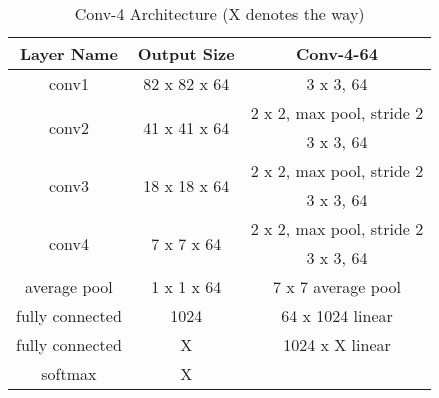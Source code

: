 \begin{table*}[hbt!]
\begin{center}
\begin{tabular}{|c|c|c|}
\hline
Layer Name             & Output Size                   & Conv-4-64                 \\ \hline\hline
conv1                  & 82 x 82 x 64                  & 3 x 3, 64                 \\ \hline
\multirow{2}{*}{conv2} & \multirow{2}{*}{41 x 41 x 64} & 2 x 2, max pool, stride 2 \\ \cline{3-3} 
                       &                               & 3 x 3, 64                 \\ \hline
\multirow{2}{*}{conv3} & \multirow{2}{*}{18 x 18 x 64} & 2 x 2, max pool, stride 2 \\ \cline{3-3} 
                       &                               & 3 x 3, 64                 \\ \hline
\multirow{2}{*}{conv4} & \multirow{2}{*}{7 x 7 x 64}   & 2 x 2, max pool, stride 2 \\ \cline{3-3} 
                       &                               & 3 x 3, 64                 \\ \hline
average pool           & 1 x 1 x 64                    & 7 x 7 average pool        \\ \hline
fully connected        & 1024                             & 64 x 1024 linear  \\ \hline
fully connected        & X                             & 1024 x X linear  \\ \hline
softmax                & X                             &                           \\ \hline
\end{tabular}
\end{center}
\caption{Conv-4 Architecture (X denotes the way)}
\label{table:conv_arch}
\end{table*}


